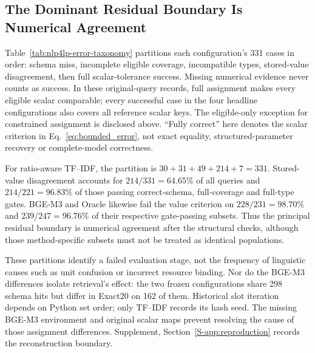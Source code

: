 \documentclass[pdflatex,sn-basic,Numbered]{sn-jnl}
\begin{document}
\subsection{The Dominant Residual Boundary Is Numerical Agreement}
\label{subsec:exp_error}
Table~\ref{tab:nlp4lp-error-taxonomy} partitions each configuration's 331 cases in order: schema miss, incomplete eligible coverage, incompatible types, stored-value disagreement, then full scalar-tolerance success. Missing numerical evidence never counts as success. In these original-query records, full assignment makes every eligible scalar comparable; every successful case in the four headline configurations also covers all reference scalar keys. The eligible-only exception for constrained assignment is disclosed above. ``Fully correct'' here denotes the scalar criterion in Eq.~\eqref{eq:bounded_error}, not exact equality, structured-parameter recovery or complete-model correctness.

For ratio-aware TF--IDF, the partition is $30+31+49+214+7=331$. Stored-value disagreement accounts for $214/331=64.65\%$ of all queries and $214/221=96.83\%$ of those passing correct-schema, full-coverage and full-type gates. BGE-M3 and Oracle likewise fail the value criterion on $228/231=98.70\%$ and $239/247=96.76\%$ of their respective gate-passing subsets. Thus the principal residual boundary is numerical agreement after the structural checks, although those method-specific subsets must not be treated as identical populations.

These partitions identify a failed evaluation stage, not the frequency of linguistic causes such as unit confusion or incorrect resource binding. Nor do the BGE-M3 differences isolate retrieval's effect: the two frozen configurations share 298 schema hits but differ in Exact20 on 162 of them. Historical slot iteration depends on Python set order; only TF--IDF records its hash seed. The missing BGE-M3 environment and original scalar maps prevent resolving the cause of those assignment differences. Supplement, Section~\ref{S-app:reproduction} records the reconstruction boundary.
\end{document}

